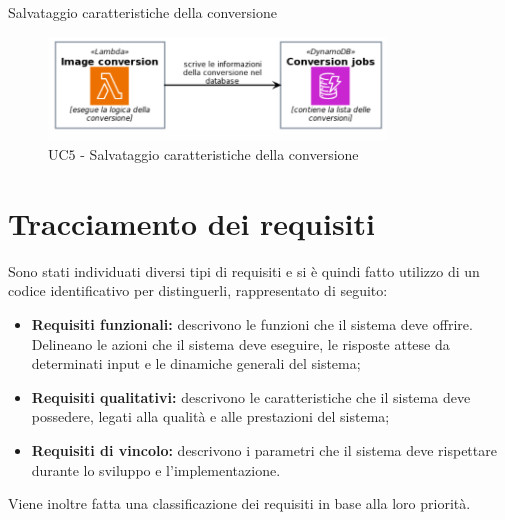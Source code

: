 \begin{usecase}{5}{Salvataggio caratteristiche della conversione}
    \begin{figure}[H]
        \centering
        \includegraphics[width=0.8\textwidth]{images/uc5.png}
        \caption{UC$5$ - Salvataggio caratteristiche della conversione}
    \end{figure}
    \label{uc:salvataggio-caratteristiche}
\end{usecase}

\section{Tracciamento dei requisiti}

Sono stati individuati diversi tipi di requisiti e si è quindi fatto utilizzo di
un codice identificativo per distinguerli, rappresentato di seguito:
\begin{itemize}
    \item \textbf{Requisiti funzionali:} descrivono le funzioni che il sistema
          deve offrire. Delineano le azioni che il sistema deve eseguire, le
          risposte attese da determinati input e le dinamiche generali del sistema;
    \item \textbf{Requisiti qualitativi:} descrivono le caratteristiche che il
          sistema deve possedere, legati alla qualità e alle prestazioni del sistema;
    \item \textbf{Requisiti di vincolo:} descrivono i parametri che il sistema
          deve rispettare durante lo sviluppo e l'implementazione.
\end{itemize}
Viene inoltre fatta una classificazione dei requisiti in base alla loro
priorità.

